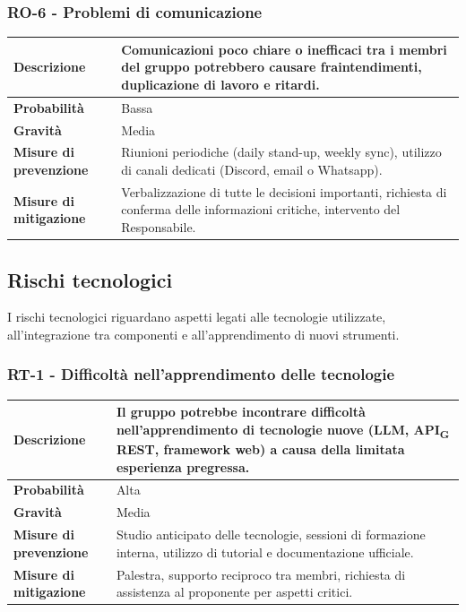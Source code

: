 \documentclass[11pt,a4paper]{article}
\newcommand{\gls}[1]{#1\textsubscript{G}}
\begin{document}
\subsubsection{RO-6 - Problemi di comunicazione}
\begin{center}
\begin{tabular}{|p{3cm}|p{12cm}|}
    \hline
    \textbf{Descrizione} & Comunicazioni poco chiare o inefficaci tra i membri del gruppo potrebbero causare fraintendimenti, duplicazione di lavoro e ritardi. \\
    \hline
    \textbf{Probabilità} & Bassa \\
    \hline
    \textbf{Gravità} & Media \\
    \hline
    \textbf{Misure di prevenzione} & Riunioni periodiche (daily stand-up, weekly sync), utilizzo di canali dedicati (Discord, email o Whatsapp). \\
    \hline
    \textbf{Misure di mitigazione} & Verbalizzazione di tutte le decisioni importanti, richiesta di conferma delle informazioni critiche, intervento del Responsabile. \\
    \hline
\end{tabular}
\end{center}

\subsection{Rischi tecnologici}
I rischi tecnologici riguardano aspetti legati alle tecnologie utilizzate, all'integrazione tra componenti e all'apprendimento di nuovi strumenti.

\subsubsection{RT-1 - Difficoltà nell'apprendimento delle tecnologie}
\begin{center}
\begin{tabular}{|p{3cm}|p{12cm}|}
    \hline
    \textbf{Descrizione} & Il gruppo potrebbe incontrare difficoltà nell'apprendimento di tecnologie nuove (LLM, \gls{API} REST, framework web) a causa della limitata esperienza pregressa. \\
    \hline
    \textbf{Probabilità} & Alta \\
    \hline
    \textbf{Gravità} & Media \\
    \hline
    \textbf{Misure di prevenzione} & Studio anticipato delle tecnologie, sessioni di formazione interna, utilizzo di tutorial e documentazione ufficiale. \\
    \hline
    \textbf{Misure di mitigazione} & Palestra, supporto reciproco tra membri, richiesta di assistenza al proponente per aspetti critici. \\
    \hline
\end{tabular}
\end{center}
\end{document}
